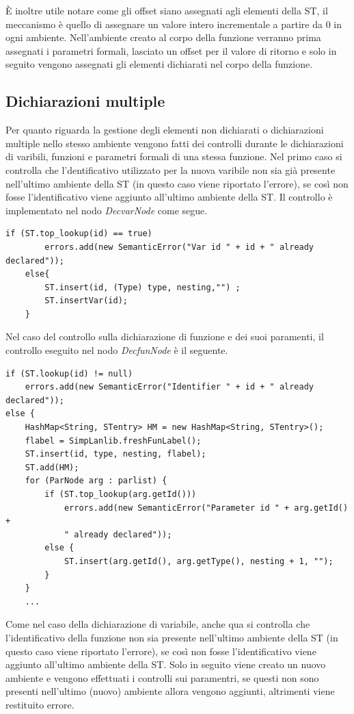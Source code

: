 È inoltre utile notare come gli offset siano assegnati agli elementi della ST, il meccanismo è quello di assegnare un valore intero incrementale a partire da 0 in ogni ambiente. Nell'ambiente creato al corpo della funzione verranno prima assegnati i parametri formali, lasciato un offset per il valore di ritorno e solo in seguito vengono assegnati gli elementi dichiarati nel corpo della funzione. 


\subsection{Dichiarazioni multiple}
Per quanto riguarda la gestione degli elementi non dichiarati o dichiarazioni multiple nello stesso ambiente vengono fatti dei controlli durante le dichiarazioni di varibili, funzioni e parametri formali di una stessa funzione.
Nel primo caso si controlla che l'dentificativo utilizzato per la nuova varibile non sia già presente nell'ultimo ambiente della ST (in questo caso viene riportato l'errore), se così non fosse l'identificativo viene aggiunto all'ultimo ambiente della ST. Il controllo è implementato nel nodo \textit{DecvarNode} come segue.
\begin{verbatim}
if (ST.top_lookup(id) == true)
        errors.add(new SemanticError("Var id " + id + " already declared"));
    else{
        ST.insert(id, (Type) type, nesting,"") ;
        ST.insertVar(id);
    }
\end{verbatim}

Nel caso del controllo sulla dichiarazione di funzione e dei suoi paramenti, il controllo eseguito nel nodo \textit{DecfunNode} è il seguente.
\begin{verbatim}
if (ST.lookup(id) != null)
    errors.add(new SemanticError("Identifier " + id + " already declared"));
else {
    HashMap<String, STentry> HM = new HashMap<String, STentry>();
    flabel = SimpLanlib.freshFunLabel();
    ST.insert(id, type, nesting, flabel);
    ST.add(HM);
    for (ParNode arg : parlist) {
        if (ST.top_lookup(arg.getId()))
            errors.add(new SemanticError("Parameter id " + arg.getId() +
            " already declared"));
        else {
            ST.insert(arg.getId(), arg.getType(), nesting + 1, "");
        }
    }
    ...
\end{verbatim}
Come nel caso della dichiarazione di variabile, anche qua si controlla che l'identificativo della funzione non sia presente nell'ultimo ambiente della ST (in questo caso viene riportato l'errore), se così non fosse l'identificativo viene aggiunto all'ultimo ambiente della ST. Solo in seguito viene creato un nuovo ambiente e vengono effettuati i controlli sui paramentri, se questi non sono presenti nell'ultimo (nuovo) ambiente allora vengono aggiunti, altrimenti viene restituito errore. 

